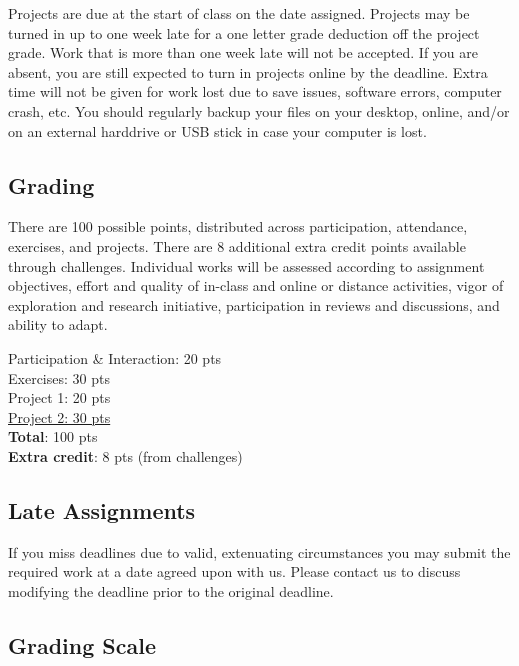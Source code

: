 Projects are due at the start of class on the date assigned. Projects may be turned in up to one week late for a one letter grade deduction off the project grade. Work that is more than one week late will not be accepted. If you are absent, you are still expected to turn in projects online by the deadline. Extra time will not be given for work lost due to save issues, software errors, computer crash, etc. You should regularly backup your files on your desktop, online, and/or on an external harddrive or USB stick in case your computer is lost.

\subsection{Grading}

There are 100 possible points, distributed across participation, attendance, exercises, and projects. There are 8 additional extra credit points available through challenges. Individual works will be assessed according to assignment objectives, effort and quality of in-class and online or distance activities, vigor of exploration and research initiative, participation in reviews and discussions, and ability to adapt.

\hspace*{1em} Participation \& Interaction: 20 pts\\
\hspace*{1em} Exercises: 30 pts\\
\hspace*{1em} Project 1: 20 pts\\
\hspace*{1em} \ul{Project 2: 30 pts}\\
\hspace*{1em} \textbf{Total}: 100 pts\\
\hspace*{1em} \textbf{Extra credit}: 8 pts (from challenges)

\subsection{Late Assignments}

If you miss deadlines due to valid, extenuating circumstances you may submit the required work at a date agreed upon with us. Please contact us to discuss modifying the deadline prior to the original deadline.

\subsection{Grading Scale}

